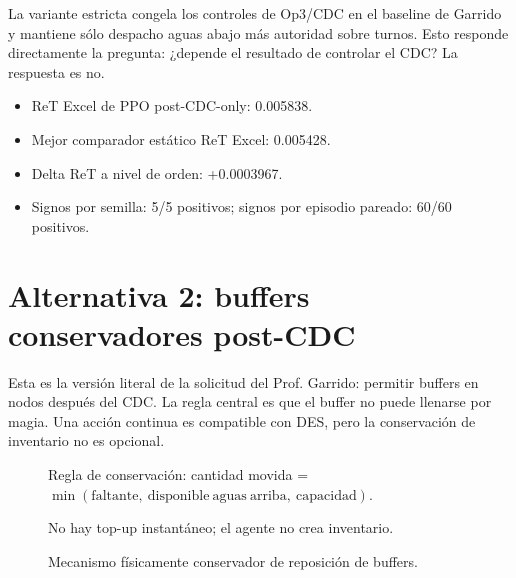\documentclass[11pt]{article}
\begin{document}
La variante estricta congela los controles de Op3/CDC en el baseline de Garrido
y mantiene sólo despacho aguas abajo más autoridad sobre turnos. Esto responde
directamente la pregunta: ¿depende el resultado de controlar el CDC? La respuesta es no.

\begin{itemize}[leftmargin=1.5em]
  \item ReT Excel de PPO post-CDC-only: 0.005838.
  \item Mejor comparador estático ReT Excel: 0.005428.
  \item Delta ReT a nivel de orden: +0.0003967.
  \item Signos por semilla: 5/5 positivos; signos por episodio pareado: 60/60 positivos.
\end{itemize}

\section*{Alternativa 2: buffers conservadores post-CDC}

Esta es la versión literal de la solicitud del Prof. Garrido: permitir buffers
en nodos después del CDC. La regla central es que el buffer no puede llenarse
por magia. Una acción continua es compatible con DES, pero la conservación de
inventario no es opcional.

\begin{figure}[ht]
  \centering
  \scriptsize
  \setlength{\fboxsep}{3pt}

  \vspace{0.5em}
  \textcolor{green!45!black}{Regla de conservación: cantidad movida =
  $\min(\mathrm{faltante},\ \mathrm{disponible\ aguas\ arriba},\ \mathrm{capacidad})$.}

  \textcolor{green!45!black}{No hay top-up instantáneo; el agente no crea inventario.}
  \caption{Mecanismo físicamente conservador de reposición de buffers.}
\end{figure}
\end{document}
